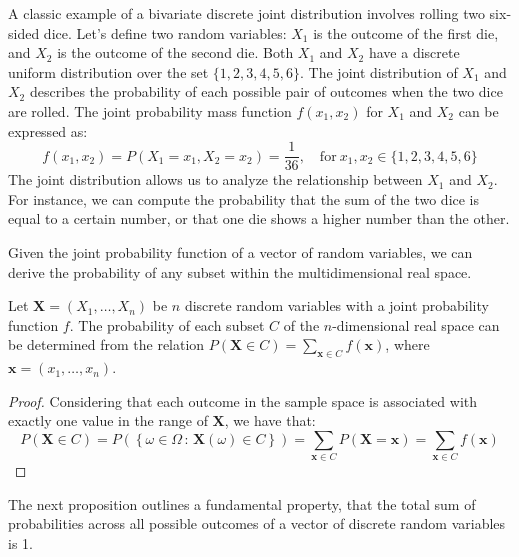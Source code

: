 \begin{example}
A classic example of a bivariate discrete joint distribution involves rolling two six-sided dice. Let's define two random variables: $X_1$ is the outcome of the first die, and $X_2$ is the outcome of the second die. Both $X_1$ and $X_2$ have a discrete uniform distribution over the set $\{1, 2, 3, 4, 5, 6\}$. The joint distribution of $X_1$ and $X_2$ describes the probability of each possible pair of outcomes when the two dice are rolled. The joint probability mass function $f(x_1, x_2)$ for $X_1$ and $X_2$ can be expressed as:
\[
f(x_1, x_2) = P(X_1 = x_1, X_2 = x_2) = \frac{1}{36}, \quad \text{for} \ x_1, x_2 \in \{1, 2, 3, 4, 5, 6\}
\]
The joint distribution allows us to analyze the relationship between $X_1$ and $X_2$. For instance, we can compute the probability that the sum of the two dice is equal to a certain number, or that one die shows a higher number than the other.
\end{example}

Given the joint probability function of a vector of random variables, we can derive the probability of any subset within the multidimensional real space.

\begin{proposition}
Let $\mathbf{X}=\left(X_{1},\ldots,X_{n}\right)$ be $n$ discrete random variables with a joint probability function $f$. The probability of each subset $C$ of the $n$-dimensional real space can be determined from the relation $P\left(\mathbf{X} \in C\right)=\sum_{\mathbf{x} \in C}f\left(\mathbf{x}\right)$, where $\mathbf{x} = (x_{1}, \ldots, x_{n})$.
\end{proposition}
\begin{proof}
Considering that each outcome in the sample space is associated with exactly one value in the range of $\mathbf{X}$, we have that:
\[
P\left(\mathbf{X} \in C\right) = P \left( \left\{ \omega \in \Omega \,:\, \mathbf{X}(\omega) \in C\right\} \right) = \sum_{\mathbf{x}\in C} P\left( \mathbf{X} = \mathbf{x} \right) = \sum_{\mathbf{x}\in C}f\left(\mathbf{x}\right)
\]
\end{proof}

The next proposition outlines a fundamental property, that the total sum of probabilities across all possible outcomes of a vector of discrete random variables is 1.

